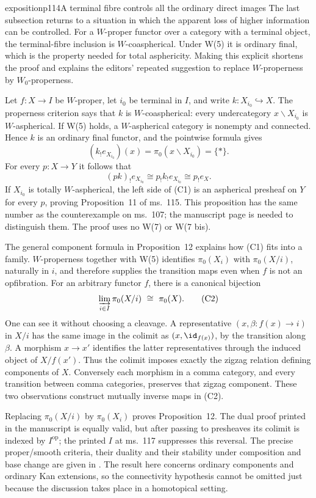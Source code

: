 \begin{dcomment}{exposition}{p114}{A terminal fibre controls all the ordinary direct images}
The last subsection returns to a situation in which the apparent loss of higher information can be controlled. For a $W$-proper functor over a category with a terminal object, the terminal-fibre inclusion is $W$-coaspherical. Under W(5) it is ordinary final, which is the property needed for total asphericity. Making this explicit shortens the proof and explains the editors' repeated suggestion to replace $W$-properness by $W_0$-properness.

Let $f:X\to I$ be $W$-proper, let $i_0$ be terminal in $I$, and write $k:X_{i_0}\hookrightarrow X$. The properness criterion says that $k$ is $W$-coaspherical: every undercategory $x\backslash X_{i_0}$ is $W$-aspherical. If W(5) holds, a $W$-aspherical category is nonempty and connected. Hence $k$ is an ordinary final functor, and the pointwise formula gives
\[
 (k_!e_{X_{i_0}})(x)=\pi_0(x\backslash X_{i_0})=\{*\}.
\]
For every $p:X\to Y$ it follows that
\[
 (pk)_!e_{X_{i_0}}
 \cong p_!k_!e_{X_{i_0}}
 \cong p_!e_X.                                      \tag{C1}
\]
If $X_{i_0}$ is totally $W$-aspherical, the left side of (C1) is an aspherical presheaf on $Y$ for every $p$, proving Proposition~11 of ms.~115. This proposition has the same number as the counterexample on ms.~107; the manuscript page is needed to distinguish them. The proof uses no W(7) or W(7 bis).

The general component formula in Proposition~12 explains how (C1) fits into a family. $W$-properness together with W(5) identifies $\pi_0(X_i)$ with $\pi_0(X/i)$, naturally in $i$, and therefore supplies the transition maps even when $f$ is not an opfibration. For an arbitrary functor $f$, there is a canonical bijection
\[
 \varinjlim_{i\in I}\pi_0(X/i)\ \cong\ \pi_0(X).        \tag{C2}
\]
One can see it without choosing a cleavage. A representative $(x,\beta:f(x)\to i)$ in $X/i$ has the same image in the colimit as $(x,\id_{f(x)})$, by the transition along $\beta$. A morphism $x\to x'$ identifies the latter representatives through the induced object of $X/f(x')$. Thus the colimit imposes exactly the zigzag relation defining components of $X$. Conversely each morphism in a comma category, and every transition between comma categories, preserves that zigzag component. These two observations construct mutually inverse maps in (C2).

Replacing $\pi_0(X/i)$ by $\pi_0(X_i)$ proves Proposition~12. The dual proof printed in the manuscript is equally valid, but after passing to presheaves its colimit is indexed by $I^{\mathrm{op}}$; the printed $I$ at ms.~117 suppresses this reversal. The precise proper/smooth criteria, their duality and their stability under composition and base change are given in \citet[Theorem~1.2 and Proposition~4.7]{Maltsiniotis2005Asphericite}. The result here concerns ordinary components and ordinary Kan extensions, so the connectivity hypothesis cannot be omitted just because the discussion takes place in a homotopical setting.
\end{dcomment}

